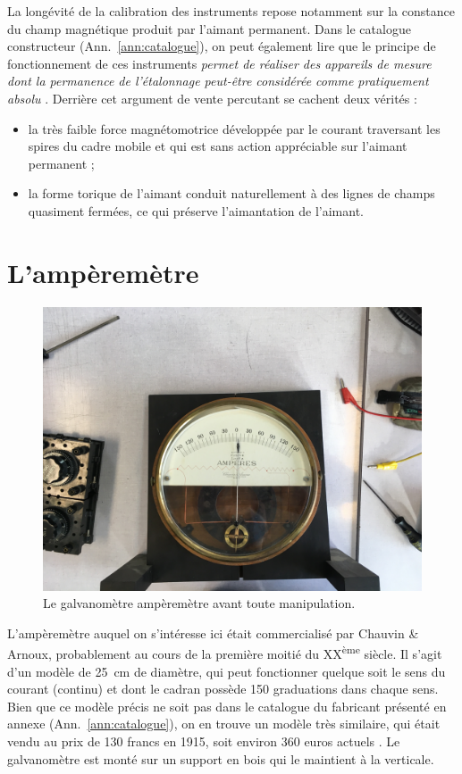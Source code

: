 \documentclass[12pt,a4paper,fleqn]{article}
\begin{document}
La longévité de la calibration des instruments repose notamment sur la constance du champ magnétique produit par l'aimant permanent.
Dans le catalogue constructeur (Ann.~\ref{ann:catalogue}), on peut également lire que le principe de fonctionnement de ces instruments \og \emph{permet de réaliser des appareils de mesure dont la permanence de l'étalonnage peut-être considérée comme pratiquement absolu} \fg{}.
Derrière cet argument de vente percutant se cachent deux vérités :
\begin{itemize}
\item \og la très faible force magnétomotrice développée par le courant traversant les spires du cadre mobile et qui est sans action appréciable sur l'aimant permanent \fg{} ;
\item la forme torique de l'aimant conduit naturellement à des lignes de champs quasiment fermées, ce qui préserve l'aimantation de l'aimant.
\end{itemize}

\section{L'ampèremètre}

\begin{figure}[htbp]
    \center
    \includegraphics[height=300 pt, trim=800 0 700 800, clip]{images/IMG_4012.JPG}
    \caption{Le galvanomètre ampèremètre avant toute manipulation.}
    \label{fig:galva_amp_av}
\end{figure}

L'ampèremètre auquel on s'intéresse ici était commercialisé par Chauvin \& Arnoux, probablement au cours de la première moitié du XX\textsuperscript{ème} siècle.
Il s'agit d'un modèle de \SI{25}{cm} de diamètre, qui peut fonctionner quelque soit le sens du courant (continu) et dont le cadran possède 150 graduations dans chaque sens.
Bien que ce modèle précis ne soit pas dans le catalogue du fabricant présenté en annexe (Ann.~\ref{ann:catalogue}), on en trouve un modèle très similaire, qui était vendu au prix de 130 francs en 1915, soit environ 360 euros actuels \cite{Alexandre2014}.
Le galvanomètre est monté sur un support en bois qui le maintient à la verticale.
\end{document}
